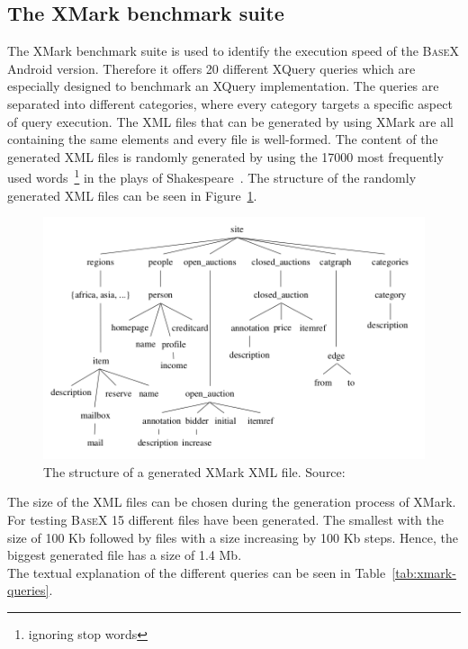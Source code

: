 \subsection{The XMark benchmark suite}
\label{subsec:the-xmark-benchmark-suite}
The XMark benchmark suite is used to identify the execution speed of the \textsc{BaseX} Android version.
Therefore it offers 20 different XQuery queries which are especially designed to benchmark an XQuery implementation.
The queries are separated into different categories, where every category targets a specific aspect of query execution.
The XML files that can be generated by using XMark are all containing the same elements and every file is well-formed.
The content of the generated XML files is randomly generated by using the 17000 most frequently used words~\footnote{ignoring stop words} in the plays of Shakespeare~\cite{schmidtxmark}.
The structure of the randomly generated XML files can be seen in Figure~\ref{fig:xmark-file-structure}.
\begin{figure}[htpb]
\begin{center}
\includegraphics[scale=0.42]{images/xmark-file-elements.png} 
\caption{The structure of a generated XMark XML file. Source:\cite{schmidtxmark}}
\label{fig:xmark-file-structure}
\end{center}
\end{figure}
\newpage
The size of the XML files can be chosen during the generation process of XMark.
For testing \textsc{BaseX} 15 different files have been generated.
The smallest with the size of 100 Kb followed by files with a size increasing by 100 Kb steps.
Hence, the biggest generated file has a size of 1.4 Mb.\\
The textual explanation of the different queries can be seen in Table~\ref{tab:xmark-queries}.
